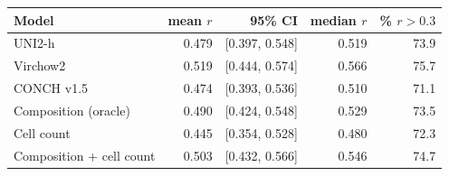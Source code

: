 \begin{tabular}{lrrrr}
\toprule
Model & mean $r$ & 95\% CI & median $r$ & \% $r{>}0.3$ \\
\midrule
UNI2-h & 0.479 & [0.397, 0.548] & 0.519 & 73.9 \\
Virchow2 & 0.519 & [0.444, 0.574] & 0.566 & 75.7 \\
CONCH v1.5 & 0.474 & [0.393, 0.536] & 0.510 & 71.1 \\
Composition (oracle) & 0.490 & [0.424, 0.548] & 0.529 & 73.5 \\
Cell count & 0.445 & [0.354, 0.528] & 0.480 & 72.3 \\
Composition + cell count & 0.503 & [0.432, 0.566] & 0.546 & 74.7 \\
\bottomrule
\end{tabular}

